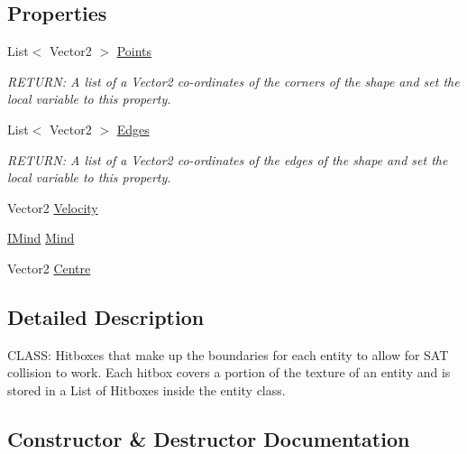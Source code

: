 \subsection*{Properties}
\begin{DoxyCompactItemize}
\item 
List$<$ Vector2 $>$ \hyperlink{a00506_ab706c341cd6e2ba930e2ffe437b6d9c7}{Points}
\begin{DoxyCompactList}\small\item\em R\+E\+T\+U\+RN\+: A list of a Vector2 co-\/ordinates of the corners of the shape and set the local variable to this property. \end{DoxyCompactList}\item 
List$<$ Vector2 $>$ \hyperlink{a00506_a32ea07f46a9cd6213e965f837758e674}{Edges}
\begin{DoxyCompactList}\small\item\em R\+E\+T\+U\+RN\+: A list of a Vector2 co-\/ordinates of the edges of the shape and set the local variable to this property. \end{DoxyCompactList}\item 
Vector2 \hyperlink{a00506_a1f0b9781e3ca7fb87c8f9d03080e9f16}{Velocity}
\item 
\hyperlink{a00446}{I\+Mind} \hyperlink{a00506_a375df917b377e1511e6accd4018a2c30}{Mind}
\item 
Vector2 \hyperlink{a00506_aea24a643fe9a06c65064bf091427c2fc}{Centre}
\end{DoxyCompactItemize}


\subsection{Detailed Description}
C\+L\+A\+SS\+: Hitboxes that make up the boundaries for each entity to allow for S\+AT collision to work. Each hitbox covers a portion of the texture of an entity and is stored in a List of Hitboxes inside the entity class. 



\subsection{Constructor \& Destructor Documentation}
\mbox{\label{a00506_a0dd1189ee2d37a3401501ca1f10b9cfa}} 
